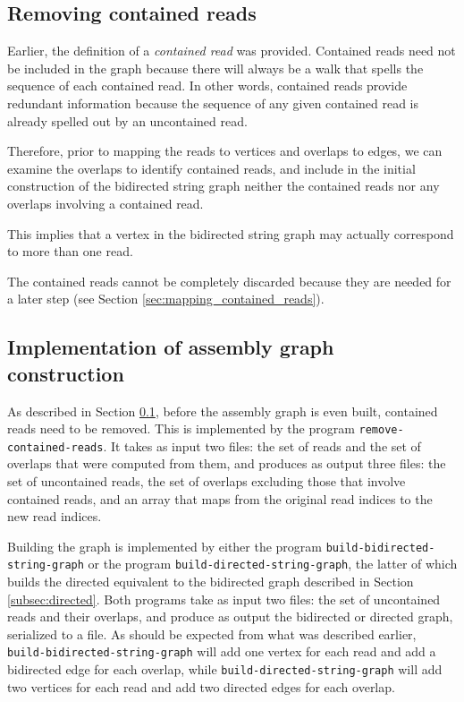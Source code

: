\documentclass[12pt]{article}
\newcommand{\Section}[1]{Section \ref{#1}}
\newcommand{\Subsection}[1]{Section \ref{#1}}
\newcommand{\KeyTerm}[1]{{\it #1}}
\newcommand{\ProgramName}[1]{{\tt #1}}
\begin{document}
\subsection{Removing contained reads}

\label{subsec:removing_contained_reads}

Earlier, the definition of a \KeyTerm{contained read} was provided.  Contained
reads need not be included in the graph because there will always be a walk that
spells the sequence of each contained read.  In other words, contained reads
provide redundant information because the sequence of any given contained read
is already spelled out by an uncontained read.

Therefore, prior to mapping the reads to vertices and overlaps to edges, we can
examine the overlaps to identify contained reads, and include in the initial
construction of the bidirected string graph neither the contained reads nor any
overlaps involving a contained read.

This implies that a vertex in the bidirected string graph may actually
correspond to more than one read.

The contained reads cannot be completely discarded because they are needed for a
later step (see \Section{sec:mapping_contained_reads}).

\subsection{Implementation of assembly graph construction}

As described in \Subsection{subsec:removing_contained_reads}, before the
assembly graph is even built, contained reads need to be removed.  This is
implemented by the program \ProgramName{remove-contained-reads}.  It takes as
input two files: the set of reads and the set of overlaps that were computed
from them, and produces as output three files: the set of uncontained reads, the
set of overlaps excluding those that involve contained reads, and an array that
maps from the original read indices to the new read indices.

Building the graph is implemented by either the program
\ProgramName{build-bidirected-string-graph} or the program
\ProgramName{build-directed-string-graph}, the latter of which builds the
directed equivalent to the bidirected graph described in
\Subsection{subsec:directed}.  Both programs take as input two files: the set of
uncontained reads and their overlaps, and produce as output the bidirected or
directed graph, serialized to a file.  As should be expected from what was
described earlier, \ProgramName{build-bidirected-string-graph} will add one
vertex for each read and add a bidirected edge for each overlap, while
\ProgramName{build-directed-string-graph} will add two vertices for each read
and add two directed edges for each overlap.
\end{document}
